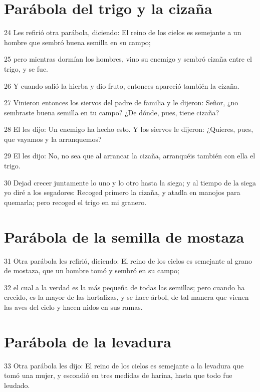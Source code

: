 \section*{Parábola del trigo y la cizaña}

\par 24 Les refirió otra parábola, diciendo: El reino de los cielos es semejante a un hombre que sembró buena semilla en su campo;
\par 25 pero mientras dormían los hombres, vino su enemigo y sembró cizaña entre el trigo, y se fue.
\par 26 Y cuando salió la hierba y dio fruto, entonces apareció también la cizaña.
\par 27 Vinieron entonces los siervos del padre de familia y le dijeron: Señor, ¿no sembraste buena semilla en tu campo? ¿De dónde, pues, tiene cizaña?
\par 28 El les dijo: Un enemigo ha hecho esto. Y los siervos le dijeron: ¿Quieres, pues, que vayamos y la arranquemos?
\par 29 El les dijo: No, no sea que al arrancar la cizaña, arranquéis también con ella el trigo.
\par 30 Dejad crecer juntamente lo uno y lo otro hasta la siega; y al tiempo de la siega yo diré a los segadores: Recoged primero la cizaña, y atadla en manojos para quemarla; pero recoged el trigo en mi granero.

\section*{Parábola de la semilla de mostaza}

\par 31 Otra parábola les refirió, diciendo: El reino de los cielos es semejante al grano de mostaza, que un hombre tomó y sembró en su campo;
\par 32 el cual a la verdad es la más pequeña de todas las semillas; pero cuando ha crecido, es la mayor de las hortalizas, y se hace árbol, de tal manera que vienen las aves del cielo y hacen nidos en sus ramas.

\section*{Parábola de la levadura}

\par 33 Otra parábola les dijo: El reino de los cielos es semejante a la levadura que tomó una mujer, y escondió en tres medidas de harina, hasta que todo fue leudado.

